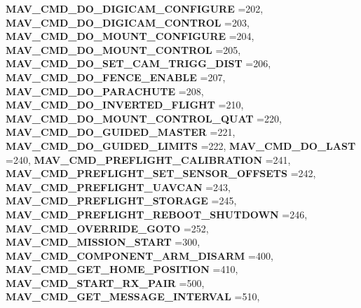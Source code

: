 \begin{DoxyCompactItemize}
\textbf{ M\+A\+V\+\_\+\+C\+M\+D\+\_\+\+D\+O\+\_\+\+D\+I\+G\+I\+C\+A\+M\+\_\+\+C\+O\+N\+F\+I\+G\+U\+RE} =202, 
\textbf{ M\+A\+V\+\_\+\+C\+M\+D\+\_\+\+D\+O\+\_\+\+D\+I\+G\+I\+C\+A\+M\+\_\+\+C\+O\+N\+T\+R\+OL} =203, 
\textbf{ M\+A\+V\+\_\+\+C\+M\+D\+\_\+\+D\+O\+\_\+\+M\+O\+U\+N\+T\+\_\+\+C\+O\+N\+F\+I\+G\+U\+RE} =204, 
\newline
\textbf{ M\+A\+V\+\_\+\+C\+M\+D\+\_\+\+D\+O\+\_\+\+M\+O\+U\+N\+T\+\_\+\+C\+O\+N\+T\+R\+OL} =205, 
\textbf{ M\+A\+V\+\_\+\+C\+M\+D\+\_\+\+D\+O\+\_\+\+S\+E\+T\+\_\+\+C\+A\+M\+\_\+\+T\+R\+I\+G\+G\+\_\+\+D\+I\+ST} =206, 
\textbf{ M\+A\+V\+\_\+\+C\+M\+D\+\_\+\+D\+O\+\_\+\+F\+E\+N\+C\+E\+\_\+\+E\+N\+A\+B\+LE} =207, 
\textbf{ M\+A\+V\+\_\+\+C\+M\+D\+\_\+\+D\+O\+\_\+\+P\+A\+R\+A\+C\+H\+U\+TE} =208, 
\newline
\textbf{ M\+A\+V\+\_\+\+C\+M\+D\+\_\+\+D\+O\+\_\+\+I\+N\+V\+E\+R\+T\+E\+D\+\_\+\+F\+L\+I\+G\+HT} =210, 
\textbf{ M\+A\+V\+\_\+\+C\+M\+D\+\_\+\+D\+O\+\_\+\+M\+O\+U\+N\+T\+\_\+\+C\+O\+N\+T\+R\+O\+L\+\_\+\+Q\+U\+AT} =220, 
\textbf{ M\+A\+V\+\_\+\+C\+M\+D\+\_\+\+D\+O\+\_\+\+G\+U\+I\+D\+E\+D\+\_\+\+M\+A\+S\+T\+ER} =221, 
\textbf{ M\+A\+V\+\_\+\+C\+M\+D\+\_\+\+D\+O\+\_\+\+G\+U\+I\+D\+E\+D\+\_\+\+L\+I\+M\+I\+TS} =222, 
\newline
\textbf{ M\+A\+V\+\_\+\+C\+M\+D\+\_\+\+D\+O\+\_\+\+L\+A\+ST} =240, 
\textbf{ M\+A\+V\+\_\+\+C\+M\+D\+\_\+\+P\+R\+E\+F\+L\+I\+G\+H\+T\+\_\+\+C\+A\+L\+I\+B\+R\+A\+T\+I\+ON} =241, 
\textbf{ M\+A\+V\+\_\+\+C\+M\+D\+\_\+\+P\+R\+E\+F\+L\+I\+G\+H\+T\+\_\+\+S\+E\+T\+\_\+\+S\+E\+N\+S\+O\+R\+\_\+\+O\+F\+F\+S\+E\+TS} =242, 
\textbf{ M\+A\+V\+\_\+\+C\+M\+D\+\_\+\+P\+R\+E\+F\+L\+I\+G\+H\+T\+\_\+\+U\+A\+V\+C\+AN} =243, 
\newline
\textbf{ M\+A\+V\+\_\+\+C\+M\+D\+\_\+\+P\+R\+E\+F\+L\+I\+G\+H\+T\+\_\+\+S\+T\+O\+R\+A\+GE} =245, 
\textbf{ M\+A\+V\+\_\+\+C\+M\+D\+\_\+\+P\+R\+E\+F\+L\+I\+G\+H\+T\+\_\+\+R\+E\+B\+O\+O\+T\+\_\+\+S\+H\+U\+T\+D\+O\+WN} =246, 
\textbf{ M\+A\+V\+\_\+\+C\+M\+D\+\_\+\+O\+V\+E\+R\+R\+I\+D\+E\+\_\+\+G\+O\+TO} =252, 
\textbf{ M\+A\+V\+\_\+\+C\+M\+D\+\_\+\+M\+I\+S\+S\+I\+O\+N\+\_\+\+S\+T\+A\+RT} =300, 
\newline
\textbf{ M\+A\+V\+\_\+\+C\+M\+D\+\_\+\+C\+O\+M\+P\+O\+N\+E\+N\+T\+\_\+\+A\+R\+M\+\_\+\+D\+I\+S\+A\+RM} =400, 
\textbf{ M\+A\+V\+\_\+\+C\+M\+D\+\_\+\+G\+E\+T\+\_\+\+H\+O\+M\+E\+\_\+\+P\+O\+S\+I\+T\+I\+ON} =410, 
\textbf{ M\+A\+V\+\_\+\+C\+M\+D\+\_\+\+S\+T\+A\+R\+T\+\_\+\+R\+X\+\_\+\+P\+A\+IR} =500, 
\textbf{ M\+A\+V\+\_\+\+C\+M\+D\+\_\+\+G\+E\+T\+\_\+\+M\+E\+S\+S\+A\+G\+E\+\_\+\+I\+N\+T\+E\+R\+V\+AL} =510, 
\newline

\end{DoxyCompactItemize}

